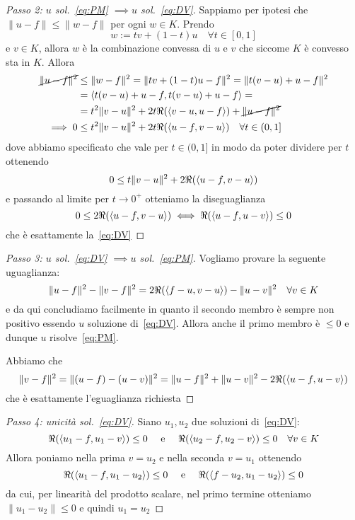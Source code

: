 \begin{proof}[Passo 2: \(u\) sol.~\eqref{eq:PM} \(\implies u \)
    sol.~\eqref{eq:DV}]\label{pf:Proiezioni-2}
    Sappiamo per ipotesi che \(\|u -f\| \le \|w - f\|\) per ogni \(w \in K\).
    Prendo 
    \[w := tv + {(1-t)}u \quad \forall t \in [0, 1]\]
    e \(v \in K\), allora
    \(w\) è la combinazione convessa di \(u\) e \(v\) che siccome \(K\) è
    convesso sta in \(K\). Allora
    \begin{align*}
        \cancel{\|u -f\|^2} &\le \|w - f\|^2 = \|tv + {(1-t)}u - f\|^2 = \|t{(v- u)} + u -
        f\|^2 \\ &= {\left\langle t(v-u) + u - f, t(v-u) + u - f\right\rangle} = \\ &= t^2\|v-u\|^2 +
        2t\Re({\left\langle v-u, u-f\right\rangle}) + \cancel{\|u-f\|^2} \\
        \implies 0 &\le t^2\|v-u\|^2 + 2t \Re{({\left\langle u - f, v-u\right\rangle} )} \quad \forall
        t \in (0, 1]
    \end{align*}
    dove abbiamo specificato che vale per \(t \in (0, 1]\) in modo da poter
    dividere per \(t\) ottenendo
    \[
        0 \le t\|v-u\|^2 + 2\Re({\left\langle u-f, v-u\right\rangle})
    \]
    e passando al limite per \(t \to 0^{+}\) otteniamo la diseguaglianza
    \[
        0 \le 2\Re {({\left\langle u -f, v-u\right\rangle} )} \iff \Re{({\left\langle u-f, u - v\right\rangle})} \le 0
    \]
    che è esattamente la~\eqref{eq:DV}
\end{proof}
\begin{proof}[Passo 3: \(u\) sol.~\eqref{eq:DV} \(\implies u\)
    sol.~\eqref{eq:PM}]\label{pf:Proiezioni-3}
    Vogliamo provare la seguente uguaglianza:
    \[
      \|u-f\|^2 - \|v-f\|^2 = 2\Re{({\left\langle f-u, v-u\right\rangle} )} - \|u-v\|^2 \quad \forall
      v \in K
    \]
    e da qui concludiamo facilmente in quanto il secondo membro è sempre non
    positivo essendo \(u\) soluzione di~\eqref{eq:DV}. Allora anche il primo
    membro è \(\le 0\) e dunque \(u\) risolve~\eqref{eq:PM}.

    Abbiamo che
    \begin{equation*}
        \|v-f\|^2 = \|(u-f) - (u-v)\|^2 = \|u-f\|^2 + \|u-v\|^2 -
        2\Re{({\left\langle u-f, u-v\right\rangle} )}
    \end{equation*}
    che è esattamente l'eguaglianza richiesta
\end{proof}
\begin{proof}[Passo 4: unicità sol.~\eqref{eq:DV}]\label{pf:Proiezioni-4}
    Siano \(u_{1}, u_{2}\) due soluzioni di~\eqref{eq:DV}:
    \[
      \Re{({\left\langle u_{1} - f, u_{1} - v\right\rangle})} \le 0 \quad \text{ e } \quad
      \Re{({\left\langle u_{2} - f, u_{2} - v\right\rangle})} \le 0 \quad \forall v \in K
    \]
    Allora poniamo nella prima \(v = u_{2}\) e nella seconda \(v = u_{1}\)
    ottenendo 
    \[
      \Re({\left\langle u_{1} - f, u_{1} - u_{2}\right\rangle}) \le 0 \quad \text{ e } \quad
      \Re({\left\langle f - u_{2}, u_{1} - u_{2}\right\rangle}) \le 0
    \]
    da cui, per linearità del prodotto scalare, nel primo termine
    otteniamo \(\|u_{1} - u_{2}\| \le 0\) e quindi \(u_{1} = u_{2}\) 
\end{proof}
